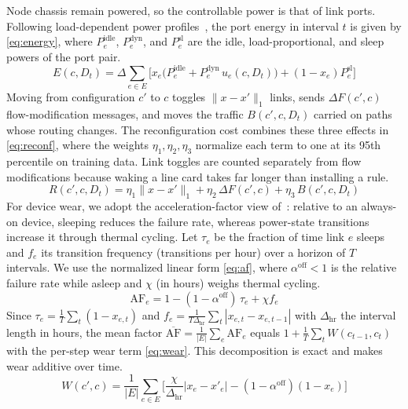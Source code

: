 \documentclass[conference]{IEEEtran}
\begin{document}
Node chassis remain powered, so the controllable power is that of link ports. Following load-dependent power profiles~\cite{restrepo2009energy,mahadevan2009power}, the port energy in interval $t$ is given by \eqref{eq:energy}, where $P^{\mathrm{idle}}_e$, $P^{\mathrm{dyn}}_e$, and $P^{\mathrm{sl}}_e$ are the idle, load-proportional, and sleep powers of the port pair.
\begin{equation}\label{eq:energy}
E(c,D_t)=\Delta\sum_{e\in E}\Big[x_e\big(P^{\mathrm{idle}}_e+P^{\mathrm{dyn}}_e\,u_e(c,D_t)\big)+(1-x_e)P^{\mathrm{sl}}_e\Big]
\end{equation}
Moving from configuration $c'$ to $c$ toggles $\|x-x'\|_1$ links, sends $\Delta F(c',c)$ flow-modification messages, and moves the traffic $B(c',c,D_t)$ carried on paths whose routing changes. The reconfiguration cost combines these three effects in \eqref{eq:reconf}, where the weights $\eta_1,\eta_2,\eta_3$ normalize each term to one at its 95th percentile on training data. Link toggles are counted separately from flow modifications because waking a line card takes far longer than installing a rule.
\begin{equation}\label{eq:reconf}
R(c',c,D_t)=\eta_1\|x-x'\|_1+\eta_2\,\Delta F(c',c)+\eta_3\,B(c',c,D_t)
\end{equation}
For device wear, we adopt the acceleration-factor view of~\cite{chiaraviglio2015lifetime}: relative to an always-on device, sleeping reduces the failure rate, whereas power-state transitions increase it through thermal cycling. Let $\tau_e$ be the fraction of time link $e$ sleeps and $f_e$ its transition frequency (transitions per hour) over a horizon of $T$ intervals. We use the normalized linear form \eqref{eq:af}, where $\alpha^{\mathrm{off}}<1$ is the relative failure rate while asleep and $\chi$ (in hours) weighs thermal cycling.
\begin{equation}\label{eq:af}
\mathrm{AF}_e=1-(1-\alpha^{\mathrm{off}})\,\tau_e+\chi f_e
\end{equation}
Since $\tau_e=\frac{1}{T}\sum_t(1-x_{e,t})$ and $f_e=\frac{1}{T\Delta_{\mathrm{hr}}}\sum_t|x_{e,t}-x_{e,t-1}|$ with $\Delta_{\mathrm{hr}}$ the interval length in hours, the mean factor $\overline{\mathrm{AF}}=\frac{1}{|E|}\sum_e\mathrm{AF}_e$ equals $1+\frac{1}{T}\sum_t W(c_{t-1},c_t)$ with the per-step wear term \eqref{eq:wear}. This decomposition is exact and makes wear additive over time.
\begin{equation}\label{eq:wear}
W(c',c)=\frac{1}{|E|}\sum_{e\in E}\Big[\frac{\chi}{\Delta_{\mathrm{hr}}}|x_e-x'_e|-(1-\alpha^{\mathrm{off}})(1-x_e)\Big]
\end{equation}
\end{document}
